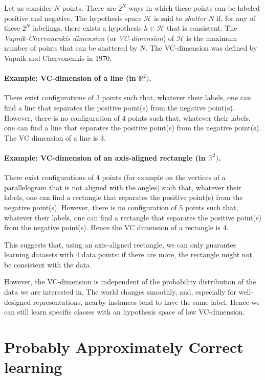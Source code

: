 \documentclass[a4paper,12pt]{article}
\newcommand{\hh}{\mathcal{H}}
\begin{document}
Let us consider $N$ points. There are $2^N$ ways in which these points can be labeled positive and negative. The hypothesis space $\hh$ is said to {\em shatter} $N$ if, for any of these $2^N$ labelings, there exists a hypothesis $h \in \hh$ that is consistent. The {\em Vapnik-Chervonenkis dimension} (or {\em VC-dimension}) of $\hh$ is the maximum number of points that can be shattered by $N$. The VC-dimension was defined by Vapnik and Chervonenkis in 1970.

\paragraph{Example: VC-dimension of a line (in $\mathbb{R}^2)$.} There exist configurations of $3$ points such that, whatever their labels, one can find a line that separates the positive point(s) from the negative point(s). However, there is no configuration of $4$ points such that, whatever their labels, one can find a line that separates the positive point(s) from the negative point(s). The VC dimension of a line is $3$.

\paragraph{Example: VC-dimension of an axis-aligned rectangle (in $\mathbb{R}^2)$.} There exist configurations of $4$ points (for example on the vertices of a parallelogram that is not aligned with the angles) such that, whatever their labels, one can find a rectangle that separates the positive point(s) from the negative point(s). However, there is no configuration of $5$ points such that, whatever their labels, one can find a rectangle that separates the positive point(s) from the negative point(s). Hence the VC dimension of a rectangle is $4$. 

This suggests that, using an axis-aligned rectangle, we can only guarantee learning datasets with $4$ data points: if there are more, the rectangle might not be consistent with the data. 

However, the VC-dimension is independent of the probability distribution of the data we are interested in. The world changes smoothly, and, especially for well-designed representations, nearby instances tend to have the same label. Hence we can still learn specific classes with an hypothesis space of low VC-dimension.

\section{Probably Approximately Correct learning}
\end{document}
